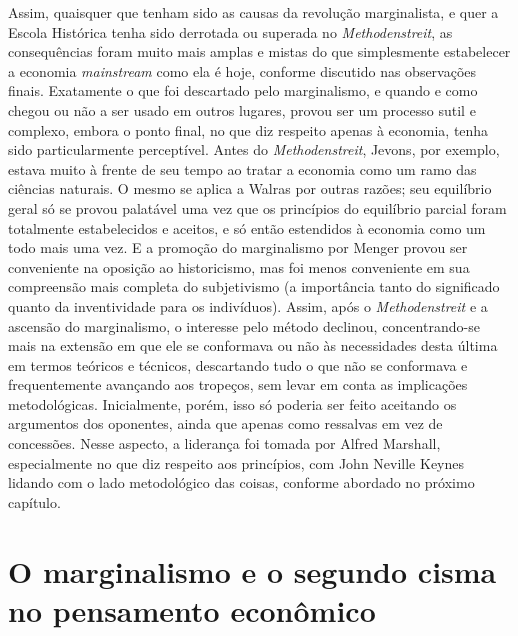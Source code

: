 \documentclass[12pt]{article}
\begin{document}
Assim, quaisquer que tenham sido as causas da revolução marginalista, e quer a Escola Histórica tenha sido derrotada ou superada no \textit{Methodenstreit}, as consequências foram muito mais amplas e mistas do que simplesmente estabelecer a economia \textit{mainstream} como ela é hoje, conforme discutido nas observações finais. Exatamente o que foi descartado pelo marginalismo, e quando e como chegou ou não a ser usado em outros lugares, provou ser um processo sutil e complexo, embora o ponto final, no que diz respeito apenas à economia, tenha sido particularmente perceptível. Antes do \textit{Methodenstreit}, Jevons, por exemplo, estava muito à frente de seu tempo ao tratar a economia como um ramo das ciências naturais. O mesmo se aplica a Walras por outras razões; seu equilíbrio geral só se provou palatável uma vez que os princípios do equilíbrio parcial foram totalmente estabelecidos e aceitos, e só então estendidos à economia como um todo mais uma vez. E a promoção do marginalismo por Menger provou ser conveniente na oposição ao historicismo, mas foi menos conveniente em sua compreensão mais completa do subjetivismo (a importância tanto do significado quanto da inventividade para os indivíduos). Assim, após o \textit{Methodenstreit} e a ascensão do marginalismo, o interesse pelo método declinou, concentrando-se mais na extensão em que ele se conformava ou não às necessidades desta última em termos teóricos e técnicos, descartando tudo o que não se conformava e frequentemente avançando aos tropeços, sem levar em conta as implicações metodológicas. Inicialmente, porém, isso só poderia ser feito aceitando os argumentos dos oponentes, ainda que apenas como ressalvas em vez de concessões. Nesse aspecto, a liderança foi tomada por Alfred Marshall, especialmente no que diz respeito aos princípios, com John Neville Keynes lidando com o lado metodológico das coisas, conforme abordado no próximo capítulo.

\section{O marginalismo e o segundo cisma no pensamento econômico}
\end{document}
